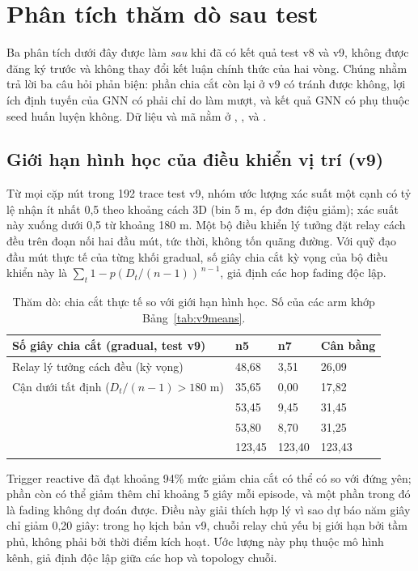 \section{Phân tích thăm dò sau test}\label{sec:posthoc}
Ba phân tích dưới đây được làm \emph{sau} khi đã có kết quả test v8 và v9, không được đăng ký trước và không thay đổi kết luận chính thức của hai vòng. Chúng nhằm trả lời ba câu hỏi phản biện: phần chia cắt còn lại ở v9 có tránh được không, lợi ích định tuyến của GNN có phải chỉ do làm mượt, và kết quả GNN có phụ thuộc seed huấn luyện không. Dữ liệu và mã nằm ở , ,  và .

\subsection{Giới hạn hình học của điều khiển vị trí (v9)}
Từ mọi cặp nút trong 192 trace test v9, nhóm ước lượng xác suất một cạnh có tỷ lệ nhận ít nhất 0,5 theo khoảng cách 3D (bin 5 m, ép đơn điệu giảm); xác suất này xuống dưới 0,5 từ khoảng 180 m. Một bộ điều khiển lý tưởng đặt relay cách đều trên đoạn nối hai đầu mút, tức thời, không tốn quãng đường. Với quỹ đạo đầu mút thực tế của từng khối gradual, số giây chia cắt kỳ vọng của bộ điều khiển này là $\sum_t 1-p(D_t/(n-1))^{\,n-1}$, giả định các hop fading độc lập.
\begin{table}[H]
\centering\small
\begin{tabularx}{\linewidth}{@{}YR{2.2cm}R{2.2cm}R{2.4cm}@{}}
\toprule\textbf{Số giây chia cắt (gradual, test v9)}&\textbf{n5}&\textbf{n7}&\textbf{Cân bằng}\\\midrule
Relay lý tưởng cách đều (kỳ vọng)&48,68&3,51&26,09\\
Cận dưới tất định ($D_t/(n-1)>180$ m)&35,65&0,00&17,82\\
&53,45&9,45&31,45\\
&53,80&8,70&31,25\\
&123,45&123,40&123,43\\\bottomrule
\end{tabularx}
\caption{Thăm dò: chia cắt thực tế so với giới hạn hình học. Số của các arm khớp Bảng~\ref{tab:v9means}.}\label{tab:posthoc-geo}
\end{table}
Trigger reactive đã đạt khoảng 94\% mức giảm chia cắt có thể có so với đứng yên; phần còn có thể giảm thêm chỉ khoảng 5 giây mỗi episode, và một phần trong đó là fading không dự đoán được. Điều này giải thích hợp lý vì sao dự báo năm giây chỉ giảm 0,20 giây: trong họ kịch bản v9, chuỗi relay chủ yếu bị giới hạn bởi tầm phủ, không phải bởi thời điểm kích hoạt. Ước lượng này phụ thuộc mô hình kênh, giả định độc lập giữa các hop và topology chuỗi.

